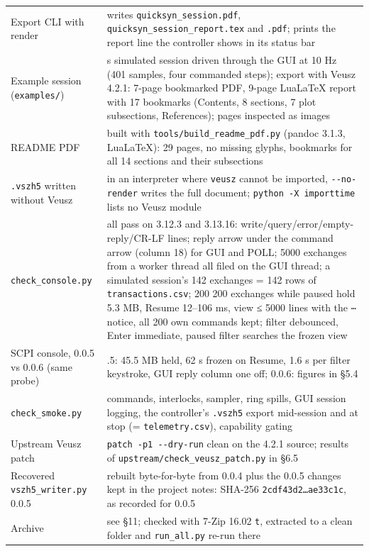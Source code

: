 \documentclass[
\directlua{luaotfload.add_fallback("qsfallback", {"DejaVu Sans:mode=harf;", "DejaVu Sans Mono:mode=harf;", "DejaVu Math TeX Gyre:mode=harf;"})}
  10pt,
  letterpaper,
]{article}
\begin{document}
\begin{longtable}[]{@{}
  >{\raggedright\arraybackslash}p{}
  >{\raggedright\arraybackslash}p{}@{}}
Export CLI with render & writes \texttt{quicksyn\_session.pdf},
\texttt{quicksyn\_session\_report.tex} and \texttt{.pdf}; prints the
report line the controller shows in its status bar \\
Example session (\texttt{examples/}) & 40 s simulated session driven
through the GUI at 10 Hz (401 samples, four commanded steps); export
with Veusz 4.2.1: 7-page bookmarked PDF, 9-page LuaLaTeX report with 17
bookmarks (Contents, 8 sections, 7 plot subsections, References); pages
inspected as images \\
README PDF & built with \texttt{tools/build\_readme\_pdf.py} (pandoc
3.1.3, LuaLaTeX): 29 pages, no missing glyphs, bookmarks for all 14
sections and their subsections \\
\texttt{.vszh5} written without Veusz & in an interpreter where
\texttt{veusz} cannot be imported, \texttt{-\/-no-render} writes the
full document; \texttt{python\ -X\ importtime} lists no Veusz module \\
\texttt{check\_console.py} & all pass on 3.12.3 and 3.13.16:
write/query/error/empty-reply/CR-LF lines; reply arrow under the command
arrow (column 18) for GUI and POLL; 5000 exchanges from a worker thread
all filed on the GUI thread; a simulated session's 142 exchanges = 142
rows of \texttt{transactions.csv}; 200 200 exchanges while paused hold
5.3 MB, Resume 12--106 ms, view ≤ 5000 lines with the \texttt{⋯} notice,
all 200 own commands kept; filter debounced, Enter immediate, paused
filter searches the frozen view \\
SCPI console, 0.0.5 vs 0.0.6 (same probe) & 0.0.5: 45.5 MB held, 62 s
frozen on Resume, 1.6 s per filter keystroke, GUI reply column one off;
0.0.6: figures in §5.4 \\
\texttt{check\_smoke.py} & commands, interlocks, sampler, ring spills,
GUI session logging, the controller's \texttt{.vszh5} export mid-session
and at stop (= \texttt{telemetry.csv}), capability gating \\
Upstream Veusz patch & \texttt{patch\ -p1\ -\/-dry-run} clean on the
4.2.1 source; results of \texttt{upstream/check\_veusz\_patch.py} in
§6.5 \\
Recovered \texttt{vszh5\_writer.py} 0.0.5 & rebuilt byte-for-byte from
0.0.4 plus the 0.0.5 changes kept in the project notes: SHA-256
\texttt{2cdf43d2…ae33c1c}, as recorded for 0.0.5 \\
Archive & see §11; checked with 7-Zip 16.02 \texttt{t}, extracted to a
clean folder and \texttt{run\_all.py} re-run there \\
\end{longtable}
\end{document}
